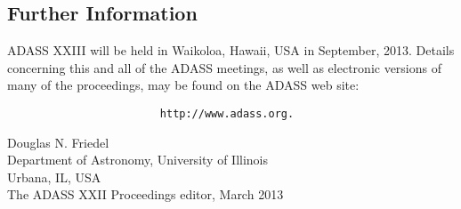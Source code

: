 \subsection{Further Information}

ADASS XXIII will be held in Waikoloa, Hawaii, USA in September, 2013. Details concerning this and all of the ADASS meetings, as well as electronic versions of many of the proceedings, may be found on the ADASS web site:
\begin{verbatim}
                        http://www.adass.org.
\end{verbatim}

\bigskip

\noindent Douglas N. Friedel\\
Department of Astronomy, University of Illinois\\
Urbana, IL, USA\\
The ADASS XXII Proceedings editor, March 2013
\vfill\eject
\thispagestyle{empty}
